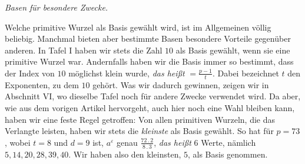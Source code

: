 \begin{center}\emph{Basen für besondere Zwecke.}\end{center}

Welche primitive Wurzel als Basis gewählt wird, ist im Allgemeinen völlig beliebig. Manchmal bieten aber bestimmte Basen besondere Vorteile gegenüber anderen. In Tafel I haben wir stets die Zahl $10$ als Basis gewählt, wenn sie eine primitive Wurzel war. Andernfalls haben wir die Basis immer so bestimmt, dass der Index von $10$ möglichst klein wurde, \emph{das heißt} $=\frac{p-1}{t}$. Dabei bezeichnet $t$ den Exponenten, zu dem $10$ gehört. Was wir dadurch gewinnen, zeigen wir in Abschnitt VI, wo dieselbe Tafel noch für andere Zwecke verwendet wird. Da aber, wie aus dem vorigen Artikel hervorgeht, auch hier noch eine Wahl bleiben kann, haben wir eine feste Regel getroffen: Von allen primitiven Wurzeln, die das Verlangte leisten, haben wir stets die \emph{kleinste} als Basis gewählt. So hat für $p=73$, wobei $t=8$ und $d=9$ ist, $a^\varepsilon$ genau $\frac{72\,.\,2}{8\,.\,3}$, \emph{das heißt} $6$ Werte, nämlich $5,14,20,28,39,40$. Wir haben also den kleinsten, $5$, als Basis genommen.
